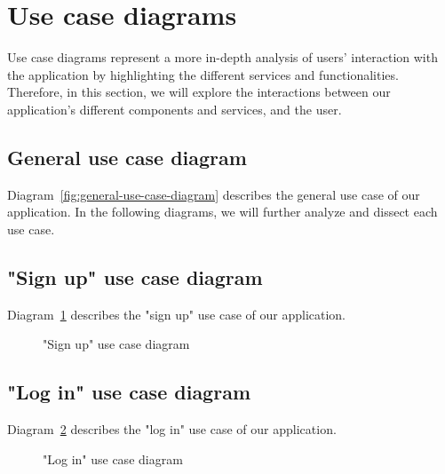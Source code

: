 \section{Use case diagrams}

Use case diagrams represent a more in-depth analysis of users' interaction with the application by highlighting the different services and functionalities. Therefore, in this section, we will explore the interactions between our application's different components and services, and the user.

\subsection{General use case diagram}
Diagram~\ref{fig:general-use-case-diagram} describes the general use case of our application.
In the following diagrams, we will further analyze and dissect each use case.



\subsection{"Sign up" use case diagram}
Diagram~\ref{fig:signup-use-case-diagram} describes the "sign up" use case of our application.

\begin{figure}[H]
	\centerfloat

	\caption{"Sign up" use case diagram}
	\label{fig:signup-use-case-diagram}
\end{figure}

\subsection{"Log in" use case diagram}
Diagram~\ref{fig:login-use-case-diagram} describes the "log in" use case of our application.

\begin{figure}[H]
	\centerfloat

	\caption{"Log in" use case diagram}
	\label{fig:login-use-case-diagram}
\end{figure}

